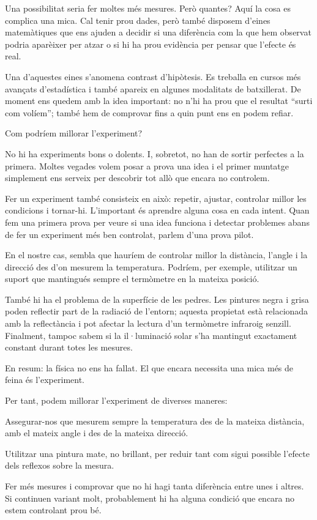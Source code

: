 Una possibilitat seria fer moltes més mesures. Però quantes? Aquí la cosa es complica una mica. Cal tenir prou dades, però també disposem d’eines matemàtiques que ens ajuden a decidir si una diferència com la que hem observat podria aparèixer per atzar o si hi ha prou evidència per pensar que l’efecte és real.

Una d’aquestes eines s’anomena contrast d’hipòtesis. Es treballa en cursos més avançats d’estadística i també apareix en algunes modalitats de batxillerat. De moment ens quedem amb la idea important: no n’hi ha prou que el resultat “surti com volíem”; també hem de comprovar fins a quin punt ens en podem refiar.


Com podríem millorar l’experiment?

No hi ha experiments bons o dolents. I, sobretot, no han de sortir perfectes a la primera. Moltes vegades volem posar a prova una idea i el primer muntatge simplement ens serveix per descobrir tot allò que encara no controlem.

Fer un experiment també consisteix en això: repetir, ajustar, controlar millor les condicions i tornar-hi. L’important és aprendre alguna cosa en cada intent. Quan fem una primera prova per veure si una idea funciona i detectar problemes abans de fer un experiment més ben controlat, parlem d’una prova pilot.

En el nostre cas, sembla que hauríem de controlar millor la distància, l’angle i la direcció des d’on mesurem la temperatura. Podríem, per exemple, utilitzar un suport que mantingués sempre el termòmetre en la mateixa posició.

També hi ha el problema de la superfície de les pedres. Les pintures negra i grisa poden reflectir part de la radiació de l’entorn; aquesta propietat està relacionada amb la reflectància i pot afectar la lectura d’un termòmetre infraroig senzill. Finalment, tampoc sabem si la il·luminació solar s’ha mantingut exactament constant durant totes les mesures.

En resum: la física no ens ha fallat. El que encara necessita una mica més de feina és l’experiment.

Per tant, podem millorar l’experiment de diverses maneres:

Assegurar-nos que mesurem sempre la temperatura des de la mateixa distància, amb el mateix angle i des de la mateixa direcció.

Utilitzar una pintura mate, no brillant, per reduir tant com sigui possible l’efecte dels reflexos sobre la mesura.

Fer més mesures i comprovar que no hi hagi tanta diferència entre unes i altres. Si continuen variant molt, probablement hi ha alguna condició que encara no estem controlant prou bé.

